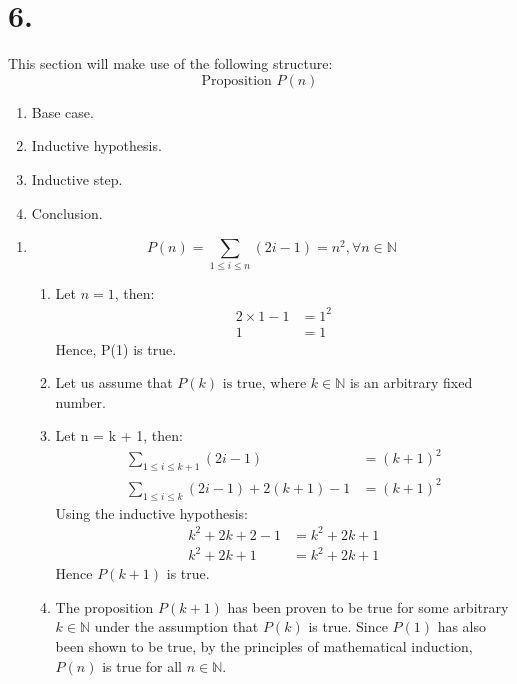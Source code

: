 \documentclass[12pt]{article}
\newcommand{\p}[1]{\item[\textnormal{(#1)}]}
\newenvironment{ps}
{\begin{enumerate}[leftmargin=0em, itemindent=1.5em]}
{\end{enumerate}}
\begin{document}
\section*{6.}

This section will make use of the following structure:
\[
    \text{Proposition } P(n)
\]   

\begin{enumerate}
    \item Base case.
    \item Inductive hypothesis.
    \item Inductive step.
    \item Conclusion.
\end{enumerate}

\begin{ps}

    \p{a} \[ P(n) = \sum_{1 \leq i \leq n} (2i - 1) = n^2, \forall n \in \mathbb{N} \]
    \begin{enumerate}[label=\arabic*.]
        \item Let \( n = 1 \), then: 
        \begin{align*}
            2 \times 1 - 1 &= 1^2 \\
            1 &= 1
        \end{align*}
        Hence, P(1) is true.

    \item Let us assume that \( P(k) \text{ is true, where } k \in \mathbb{N} \) is an arbitrary
        fixed number.

    \item Let n = k + 1, then:
    \begin{align*}
        \sum_{1 \leq i \leq k+1} (2i-1) &= (k+1)^2 \\
        \sum_{1 \leq i \leq k} (2i-1) + 2(k+1) - 1 &= (k+1)^2 
    \end{align*}
    Using the inductive hypothesis:
    \begin{align*}
            k^2 + 2k + 2 - 1 &= k^2 + 2k + 1 \\
            k^2 + 2k + 1 &= k^2 + 2k + 1
    \end{align*}
    Hence \( P(k+1) \) is true.

    \item The proposition \( P(k+1) \) has been proven to be true for some arbitrary \( k \in
        \mathbb{N} \) under the assumption that \( P(k) \) is true. Since \( P(1) \) has also been
        shown to be true, by the principles of mathematical induction, \( P(n) \) is true for all \( n \in
        \mathbb{N} \).


\end{enumerate}
\end{ps}
\end{document}

